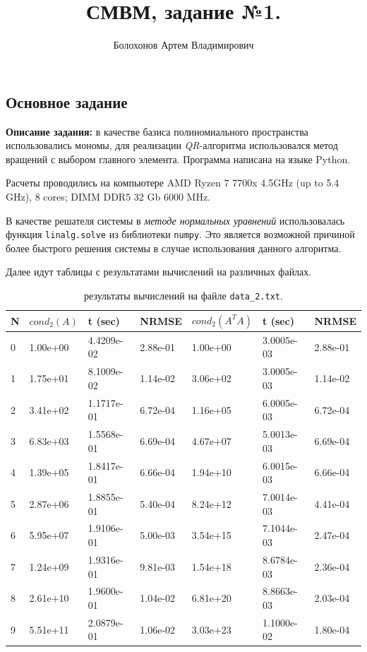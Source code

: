 \documentclass{article}
\title{СМВМ, задание №1.}
\author{Болохонов Артем Владимирович}
\begin{document}
\date{}
\maketitle

\begin{center}
    {\section*{Основное задание}}
\end{center}


\textbf{Описание задания:} в качестве базиса полиномиального пространства использовались мономы, для реализации \textit{QR}-алгоритма использовался метод вращений с
выбором главного элемента. Программа написана на языке Python.


Расчеты проводились на компьютере AMD Ryzen 7 7700x 4.5GHz (up to 5.4 GHz), 8 cores; DIMM DDR5 32 Gb 6000 MHz.


В качестве решателя системы в \textit{методе нормальных уравнений} использовалась функция \texttt{linalg.solve} из библиотеки \texttt{numpy}. Это является возможной причиной более быстрого решения системы в случае использования данного алгоритма.

Далее идут таблицы с результатами вычислений на различных файлах.

\begin{table}[h!]
\begin{tabular}{|l||l|l|l||l|l|l|}
\hline
N & $cond_2(A)$ & t (sec)    & NRMSE    & $cond_2(A^TA)$ & t (sec)    & NRMSE    \\ \hline
0 & 1.00e+00   & 4.4209e-02 & 2.88e-01 & 1.00e+00                       & 3.0005e-03 & 2.88e-01 \\ \hline
1 & 1.75e+01   & 8.1009e-02 & 1.14e-02 & 3.06e+02                       & 3.0005e-03 & 1.14e-02 \\ \hline
2 & 3.41e+02   & 1.1717e-01 & 6.72e-04 & 1.16e+05                       & 6.0005e-03 & 6.72e-04 \\ \hline
3 & 6.83e+03   & 1.5568e-01 & 6.69e-04 & 4.67e+07                       & 5.0013e-03 & 6.69e-04 \\ \hline
4 & 1.39e+05   & 1.8417e-01 & 6.66e-04 & 1.94e+10                       & 6.0015e-03 & 6.66e-04 \\ \hline
5 & 2.87e+06   & 1.8855e-01 & 5.40e-04 & 8.24e+12                       & 7.0014e-03 & 4.41e-04 \\ \hline
6 & 5.95e+07   & 1.9106e-01 & 5.00e-03 & 3.54e+15                       & 7.1044e-03 & 2.47e-04 \\ \hline
7 & 1.24e+09   & 1.9316e-01 & 9.81e-03 & 1.54e+18                       & 8.6784e-03 & 2.36e-04 \\ \hline
8 & 2.61e+10   & 1.9600e-01 & 1.04e-02 & 6.81e+20                       & 8.8663e-03 & 2.03e-04 \\ \hline
9 & 5.51e+11   & 2.0879e-01 & 1.06e-02 & 3.03e+23                       & 1.1000e-02 & 1.80e-04 \\ \hline
\end{tabular}
\caption{результаты вычислений на файле \texttt{data\_2.txt}.}
\end{table}
\end{document}

